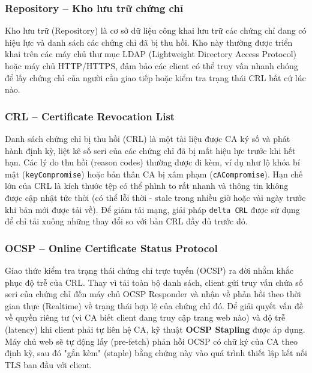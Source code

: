 \subsubsection*{Repository -- Kho lưu trữ chứng chỉ}
Kho lưu trữ (Repository) là cơ sở dữ liệu công khai lưu trữ các chứng chỉ đang có hiệu lực và danh sách các chứng chỉ đã bị thu hồi. Kho này thường được triển khai trên các máy chủ thư mục LDAP (Lightweight Directory Access Protocol) hoặc máy chủ HTTP/HTTPS, đảm bảo các client có thể truy vấn nhanh chóng để lấy chứng chỉ của người cần giao tiếp hoặc kiểm tra trạng thái CRL bất cứ lúc nào.

\subsubsection*{CRL -- Certificate Revocation List}
Danh sách chứng chỉ bị thu hồi (CRL) là một tài liệu được CA ký số và phát hành định kỳ, liệt kê số seri của các chứng chỉ đã bị mất hiệu lực trước khi hết hạn. Các lý do thu hồi (reason codes) thường được đi kèm, ví dụ như lộ khóa bí mật (\texttt{keyCompromise}) hoặc bản thân CA bị xâm phạm (\texttt{cACompromise}). Hạn chế lớn của CRL là kích thước tệp có thể phình to rất nhanh và thông tin không được cập nhật tức thời (có thể lỗi thời - stale trong nhiều giờ hoặc vài ngày trước khi bản mới được tải về). Để giảm tải mạng, giải pháp \texttt{delta CRL} \cite{RFC5280} được sử dụng để chỉ tải xuống những thay đổi so với bản CRL đầy đủ trước đó.

\subsubsection*{OCSP -- Online Certificate Status Protocol}
Giao thức kiểm tra trạng thái chứng chỉ trực tuyến (OCSP) \cite{RFC6960} ra đời nhằm khắc phục độ trễ của CRL. Thay vì tải toàn bộ danh sách, client gửi truy vấn chứa số seri của chứng chỉ đến máy chủ OCSP Responder và nhận về phản hồi theo thời gian thực (Realtime) về trạng thái hợp lệ của chứng chỉ đó. Để giải quyết vấn đề về quyền riêng tư (vì CA biết client đang truy cập trang web nào) và độ trễ (latency) khi client phải tự liên hệ CA, kỹ thuật \textbf{OCSP Stapling} \cite{RFC6066} được áp dụng. Máy chủ web sẽ tự động lấy (pre-fetch) phản hồi OCSP có chữ ký của CA theo định kỳ, sau đó "gắn kèm" (staple) bằng chứng này vào quá trình thiết lập kết nối TLS ban đầu với client.

